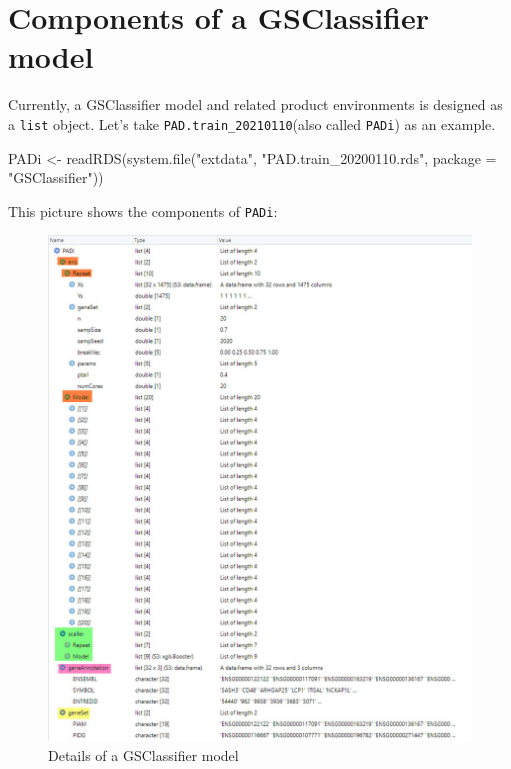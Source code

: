 \documentclass[
  12pt,
]{book}
\newenvironment{Shaded}{\begin{snugshade}}{\end{snugshade}}
\newcommand{\AttributeTok}[1]{\textcolor[rgb]{0.77,0.63,0.00}{#1}}
\newcommand{\FunctionTok}[1]{\textcolor[rgb]{0.00,0.00,0.00}{#1}}
\newcommand{\NormalTok}[1]{#1}
\newcommand{\OtherTok}[1]{\textcolor[rgb]{0.56,0.35,0.01}{#1}}
\newcommand{\StringTok}[1]{\textcolor[rgb]{0.31,0.60,0.02}{#1}}
\begin{document}
\hypertarget{components-of-a-gsclassifier-model}{%
\section{Components of a GSClassifier model}\label{components-of-a-gsclassifier-model}}

Currently, a GSClassifier model and related product environments is designed as a \texttt{list} object. Let's take \texttt{PAD.train\_20210110}(also called \texttt{PADi}) as an example.

\begin{Shaded}
\begin{Highlighting}[]
\NormalTok{PADi }\OtherTok{\textless{}{-}} \FunctionTok{readRDS}\NormalTok{(}\FunctionTok{system.file}\NormalTok{(}\StringTok{"extdata"}\NormalTok{, }\StringTok{"PAD.train\_20200110.rds"}\NormalTok{, }\AttributeTok{package =} \StringTok{"GSClassifier"}\NormalTok{)) }
\end{Highlighting}
\end{Shaded}

This picture shows the components of \texttt{PADi}:

\begin{figure}

{\centering \includegraphics[width=0.9\linewidth]{./fig/GSClassifier-model} 

}

\caption{Details of a GSClassifier model}\label{fig:GSClassifierModel}
\end{figure}
\end{document}
